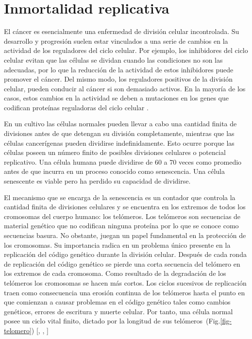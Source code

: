 \section{Inmortalidad replicativa}
\hspace{.1cm}El cáncer es esencialmente una enfermedad de división celular incontrolada. Su desarrollo y progresión suelen estar vinculados a una serie de cambios en la actividad de los reguladores del ciclo celular. Por ejemplo, los inhibidores del ciclo celular evitan que las células se dividan cuando las condiciones no son las adecuadas, por lo que la reducción de la actividad de estos inhibidores puede promover el cáncer. Del mismo modo, los reguladores positivos de la división celular, pueden conducir al cáncer si son demasiado activos. En la mayoría de los casos, estos cambios en la actividad se deben a mutaciones en los genes que codifican proteínas reguladoras del ciclo celular \cite{khanacademy2024}.

\hspace{.1cm}En un cultivo las células normales pueden llevar a cabo una cantidad finita de divisiones antes de que detengan su división completamente, mientras que las células cancerígenas pueden dividirse indefinidamente. Esto ocurre porque las células poseen un número finito de posibles divisiones celulares o potencial replicativo. Una célula humana puede dividirse de 60 a 70 veces como promedio antes de que incurra en un proceso conocido como senescencia. Una célula senescente es viable pero ha perdido su capacidad de dividirse.

\hspace{.1cm}El mecanismo que se encarga de la senescencia es un contador que controla la cantidad finita de divisiones celulares y se encuentra en los extremos de todos los cromosomas del cuerpo humano: los telómeros. Los telómeros son secuencias de material genético que no codifican ninguna proteína por lo que se conoce como secuencias basura. No obstante, juegan un papel fundamental en la protección de los cromosomas. Su importancia radica en un problema único presente en la replicación del código genético durante la división celular. Después de cada ronda de replicación del código genético se pierde una corta secuencia del telómero en los extremos de cada cromosoma. Como resultado de la degradación de los telómeros los cromosomas se hacen más cortos. Los ciclos sucesivos de replicación traen como consecuencia una erosión continua de los telómeros hasta el punto en que comienzan a causar problemas en el código genético tales como cambios genéticos, errores de escritura y muerte celular. Por tanto, una célula normal posee un ciclo vital finito, dictado por la longitud de sus telómeros~(Fig.\ref{fig-telomero}) [\cite{robins}, \cite{hanahan}, \cite{cancerbook}]

